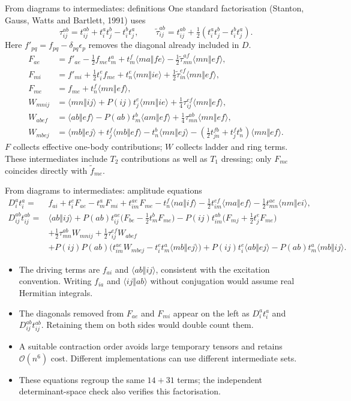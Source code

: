\documentclass[aspectratio=169,10pt]{beamer}
\newcommand{\as}[4]{\langle #1#2\Vert #3#4\rangle}
\begin{document}
\begin{frame}{From diagrams to intermediates: definitions}
\small
One standard factorisation (Stanton, Gauss, Watts and Bartlett, 1991) uses
\[
 \tau_{ij}^{ab}=t_{ij}^{ab}+t_i^at_j^b-t_i^bt_j^a,\qquad
 \tilde\tau_{ij}^{ab}=t_{ij}^{ab}+\tfrac12(t_i^at_j^b-t_i^bt_j^a).
\]
Here $f'_{pq}=f_{pq}-\delta_{pq}\epsilon_p$ removes the diagonal already included in $D$.
\begin{align*}
F_{ae}&=f'_{ae}-\tfrac12f_{me}t_m^a+t_m^f\as mafe-\tfrac12\tilde\tau_{mn}^{af}\as mnef,\\
F_{mi}&=f'_{mi}+\tfrac12t_i^ef_{me}+t_n^e\as mnie+\tfrac12\tilde\tau_{in}^{ef}\as mnef,\\
F_{me}&=f_{me}+t_n^f\as mnef,\\
W_{mnij}&=\as mnij+P(ij)t_j^e\as mnie+\tfrac14\tau_{ij}^{ef}\as mnef,\\
W_{abef}&=\as abef-P(ab)t_m^b\as amef+\tfrac14\tau_{mn}^{ab}\as mnef,\\
W_{mbej}&=\as mbej+t_j^f\as mbef-t_n^b\as mnej
 -(\tfrac12t_{jn}^{fb}+t_j^ft_n^b)\as mnef .
\end{align*}
$F$ collects effective one-body contributions; $W$ collects ladder and ring terms.
These intermediates include $T_2$ contributions as well as $T_1$ dressing;
only $F_{me}$ coincides directly with $\tilde f_{me}$.
\end{frame}

\begin{frame}{From diagrams to intermediates: amplitude equations}
\footnotesize
\begin{align*}
D_i^at_i^a={}&f_{ai}+t_i^eF_{ae}-t_m^aF_{mi}+t_{im}^{ae}F_{me}
 -t_n^f\as naif-\tfrac12t_{im}^{ef}\as maef-\tfrac12t_{mn}^{ae}\as nmei,\\[0.4em]
D_{ij}^{ab}t_{ij}^{ab}={}&\as abij
 +P(ab)t_{ij}^{ae}\bigl(F_{be}-\tfrac12t_m^bF_{me}\bigr)
 -P(ij)t_{im}^{ab}\bigl(F_{mj}+\tfrac12t_j^eF_{me}\bigr)\\
 &+\tfrac12\tau_{mn}^{ab}W_{mnij}+\tfrac12\tau_{ij}^{ef}W_{abef}\\
 &+P(ij)P(ab)\bigl(t_{im}^{ae}W_{mbej}-t_i^et_m^a\as mbej\bigr)
 +P(ij)t_i^e\as abej-P(ab)t_m^a\as mbij .
\end{align*}
\small
\begin{itemize}
\item The driving terms are $f_{ai}$ and $\as abij$, consistent with the excitation convention. Writing $f_{ia}$ and $\as ijab$ without conjugation would assume real Hermitian integrals.
\item The diagonals removed from $F_{ae}$ and $F_{mi}$ appear on the left as $D_i^at_i^a$ and $D_{ij}^{ab}t_{ij}^{ab}$. Retaining them on both sides would double count them.
\item A suitable contraction order avoids large temporary tensors and retains $\mathcal O(n^6)$ cost. Different implementations can use different intermediate sets.
\item These equations regroup the same $14+31$ terms; the independent determinant-space check also verifies this factorisation.
\end{itemize}
\end{frame}
\end{document}
